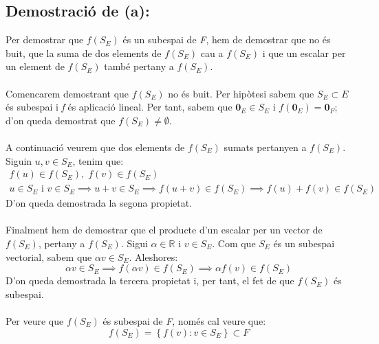 \documentclass[a4paper, 11pt]{article}
\begin{document}
        \subsection*{Demostraci\'o de (a):}
            Per demostrar que ${f(S_E)}$ \'es un subespai de \emph{F}, hem de demostrar que no \'es buit, que la suma de dos elements de ${f(S_E)}$ cau a ${f(S_E)}$ i que un escalar per un element de ${f(S_E)}$ tamb\'e pertany a ${f(S_E)}$.\\\\
            Comencarem demostrant que ${f(S_E)}$ no \'es buit. Per hip\`otesi sabem que ${S_E \subset E}$ \'es subespai i \emph{f} \'es aplicaci\'o lineal. Per tant, sabem que ${\mathbf{0}_E \in S_E}$ i ${f(\mathbf{0}_E) = \mathbf{0}_F}$; d'on queda demostrat que ${f(S_E) \neq \emptyset}$.\\\\
            A continuaci\'o veurem que dos elements de ${f(S_E)}$ sumats pertanyen a ${f(S_E)}$. Siguin ${u, v \in S_E}$, tenim que:
            \begin{gather*}
                f(u) \in f(S_E),\;  f(v) \in f(S_E)\\
                u \in S_E \text{ i } v\in S_E \implies u+v\in S_E \implies f(u+v) \in f(S_E) \implies f(u) + f(v) \in f(S_E)
            \end{gather*}
            D'on queda demostrada la segona propietat.\\\\
            Finalment hem de demostrar que el producte d'un escalar per un vector de ${f(S_E)}$, pertany a ${f(S_E)}$. Sigui ${\alpha \in \mathbb{R}}$ i ${v \in S_E}$. Com que ${S_E}$ \'es un subespai vectorial, sabem que ${\alpha v \in S_E}$. Aleshores:
            \begin{equation*}
                \alpha v \in S_E \implies f(\alpha v) \in f(S_E) \implies \alpha f(v) \in f(S_E)
            \end{equation*}
            D'on queda demostrada la tercera propietat i, per tant, el fet de que ${f(S_E)}$ \'es subespai.\\\\
            Per veure que ${f(S_E)}$ \'es subespai de \emph{F}, nom\'es cal veure que:
            \begin{equation*}
                f(S_E) = \left\{f(v): v\in S_E\right\} \subset F
            \end{equation*}
\end{document}
